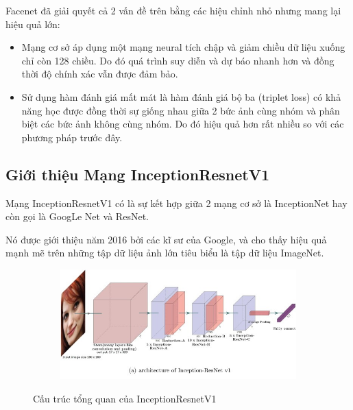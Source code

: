 Facenet đã giải quyết cả 2 vấn đề trên bằng các hiệu chỉnh nhỏ nhưng mang lại hiệu quả lớn:

\begin{itemize}
    \item Mạng cơ sở áp dụng một mạng neural tích chập và giảm chiều dữ
          liệu xuống chỉ còn 128 chiều. Do đó quá trình suy diễn và dự báo nhanh hơn và
          đồng thời độ chính xác vẫn được đảm bảo.
    \item Sử dụng hàm đánh giá mất mát là hàm đánh giá bộ ba (triplet loss) có khả năng học được đồng thời
          sự giống nhau giữa 2 bức ảnh cùng nhóm và phân biệt các bức ảnh không cùng nhóm.
          Do đó hiệu quả hơn rất nhiều so với các phương pháp trước đây.
\end{itemize}

\newpage
\subsection{Giới thiệu Mạng InceptionResnetV1}

Mạng InceptionResnetV1\cite{resnet} có là sự kết hợp giữa 2 mạng cơ sở là InceptionNet hay còn gọi là GoogLe Net và ResNet.

Nó được giới thiệu năm 2016 bởi các kĩ sư của Google, và cho thấy hiệu quả mạnh mẽ trên những tập dữ liệu ảnh lớn
tiêu biểu là tập dữ liệu ImageNet.

\begin{figure}
    \begin{subfigure}{1.\textwidth}
        \begin{center}
            \includegraphics[width=1.\linewidth]{Chapters/items/chap2_19.jpg}
        \end{center}
        \label{fig: chap2_19}
    \end{subfigure}
    \caption{Cấu trúc tổng quan của InceptionResnetV1}
\end{figure}

